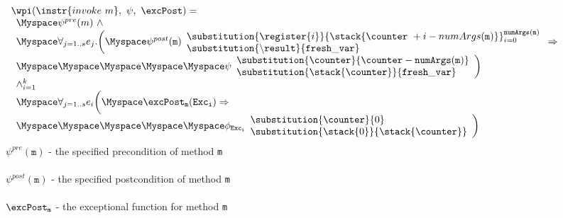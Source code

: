 \begin{figure}[!ht]
$$
\begin{array}{l}
\wpi(\instr{invoke \  m}, \ \psi ,\ \excPost) =\\ 
\begin{array}{l}
\Myspace \psi^{pre}(m) \ \wedge \\
\Myspace  \forall_{j = 1..s} e_{j}.\biggl( 
\Myspace \psi^{post}( \texttt{m}) 
                     \begin{array}{l}
                     \substitution{\register{i}}{\stack{\counter \ + i - numArgs(\texttt{m}) }}_{i=0}^{\tt{numArgs(m )}}  \\
                      \substitution{\tt{\backslash result} }{ fresh\_var } \\
                     \end{array} \Rightarrow  \\
\Myspace\Myspace\Myspace\Myspace\Myspace   \psi  \begin{array}{l}
                             \substitution{\counter }{\counter - \tt{numArgs}( \texttt{m} )} \\
                             \substitution{\stack{\counter } }{ \tt{fresh\_var}}  \   
                         \end{array}\biggr) \\
\wedge_{i = 1}^k\\
\Myspace \forall_{j = 1..s} e_i \biggl( 
\Myspace \excPost_{\tt{m} } ( \tt{Exc_i} )\Rightarrow \\
\Myspace\Myspace\Myspace\Myspace\Myspace   \phi_{\tt{Exc_i} }
                                 \begin{array}{l}
                                       \substitution{ \counter}{  0} \\
                                        \substitution{\stack{0}}{ \stack{\counter}}   
              		\end{array}   \biggr)   \\
\end{array} \\[15 mm]
\end{array}
$$
$\psi^{pre}(\texttt{m})$ -  the specified  precondition of  method \texttt{m} \\
\\
$\psi^{post}(\texttt{m})$ - the   specified   postcondition   of   method  \texttt{m}  \\
\\
$\excPost_{\texttt{m}}$ - the   exceptional   function   for   method  \texttt{m}  \\

\end{figure}
